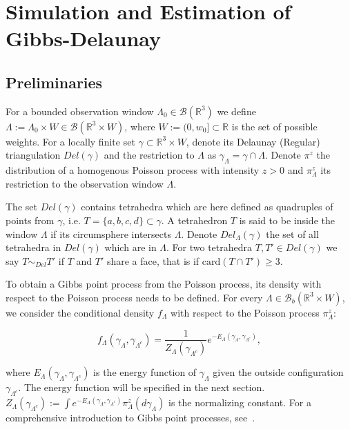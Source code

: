 \documentclass[12pt,a4paper]{report}
\begin{document}
\chapter{Simulation and Estimation of Gibbs-Delaunay}


\section{Preliminaries}
For a bounded observation window $\Lambda_0 \in\mathcal B(\mathbb R^3)$ we define  $\Lambda := \Lambda_0 \times W \in \mathcal B(\mathbb R^3 \times W)$, where  $W:=(0,w_0]\subset \mathbb R$ is the set of possible weights. For a locally finite set $\gamma\subset \mathbb R^3\times W $, denote its Delaunay (Regular) triangulation $Del(\gamma)$ and the restriction to $\Lambda$ as  $\gamma_\Lambda = \gamma \cap \Lambda$. Denote $\pi^z$ the distribution of a homogenous Poisson process with intensity $z>0$ and $\pi^z_\Lambda$ its restriction to the observation window $\Lambda$. 

The set $Del(\gamma)$ contains tetrahedra which are here defined as quadruples of points from $\gamma$, i.e. $T=\{a,b,c,d\}\subset \gamma$. A tetrahedron $T$ is said to be inside the window $\Lambda$ if its circumsphere intersects $\Lambda$. Denote $Del_\Lambda(\gamma)$ the set of all tetrahedra in $Del(\gamma)$ which are in $\Lambda$. For two tetrahedra $T,T'\in Del(\gamma)$ we say $T\sim_{Del} T'$ if $T$ and $T'$ share a face, that is if $\text{card}(T\cap T') \geq 3$. 

To obtain a Gibbs point process from the Poisson process, its density with respect to the Poisson process needs to be defined. For every $\Lambda \in \mathcal B_b(\mathbb R^3\times W)$, we consider the conditional density $f_\Lambda$ with respect to the Poisson process $\pi^z_\Lambda$:

$$ f_\Lambda(\gamma_\Lambda, \gamma_{\Lambda^c}) = \frac 1{Z_\Lambda(\gamma_{\Lambda^c})} e^{-E_\Lambda (\gamma_\Lambda, \gamma_{\Lambda^c})},$$ 

where $E_\Lambda(\gamma_\Lambda, \gamma_{\Lambda^c})$ is the energy function of $\gamma_\Lambda$ given the outside configuration $\gamma_{\Lambda^c}$. The energy function will be specified in the next section. $Z_\Lambda(\gamma_{\Lambda^c}) := \int e^{-E_\Lambda(\gamma_\Lambda, \gamma_{\Lambda^c})} \pi^z_\Lambda(d\gamma_\Lambda)$ is the normalizing constant.
For a comprehensive introduction to Gibbs point processes, see~\cite{dereudre2017}.
\end{document}
